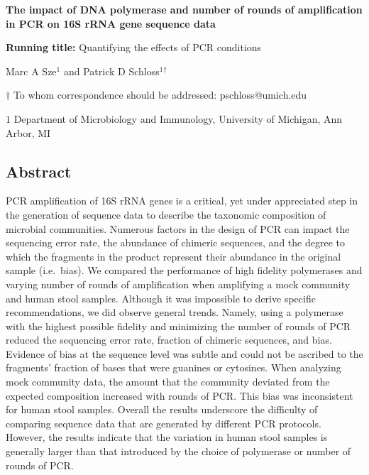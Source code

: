 \documentclass[11pt,]{article}
\title{}
\author{}
\date{}
\begin{document}
\vspace{25mm}
\begin{center}


\textbf{\huge The impact of DNA polymerase and number of rounds of amplification in PCR on 16S rRNA gene sequence data}

\vspace{50mm}



\textbf{Running title:} Quantifying the effects of PCR conditions

\vspace{25mm}

Marc A Sze${^1}$ and Patrick D Schloss${^1}$${^\dagger}$

\vspace{20mm}

$\dagger$ To whom correspondence should be addressed: pschloss@umich.edu

$1$ Department of Microbiology and Immunology, University of Michigan, Ann Arbor, MI

\end{center}

\newpage
\linenumbers

\hypertarget{abstract}{%
\subsection{Abstract}\label{abstract}}

PCR amplification of 16S rRNA genes is a critical, yet under appreciated
step in the generation of sequence data to describe the taxonomic
composition of microbial communities. Numerous factors in the design of
PCR can impact the sequencing error rate, the abundance of chimeric
sequences, and the degree to which the fragments in the product
represent their abundance in the original sample (i.e.~bias). We
compared the performance of high fidelity polymerases and varying number
of rounds of amplification when amplifying a mock community and human
stool samples. Although it was impossible to derive specific
recommendations, we did observe general trends. Namely, using a
polymerase with the highest possible fidelity and minimizing the number
of rounds of PCR reduced the sequencing error rate, fraction of chimeric
sequences, and bias. Evidence of bias at the sequence level was subtle
and could not be ascribed to the fragments' fraction of bases that were
guanines or cytosines. When analyzing mock community data, the amount
that the community deviated from the expected composition increased with
rounds of PCR. This bias was inconsistent for human stool samples.
Overall the results underscore the difficulty of comparing sequence data
that are generated by different PCR protocols. However, the results
indicate that the variation in human stool samples is generally larger
than that introduced by the choice of polymerase or number of rounds of
PCR.
\end{document}
